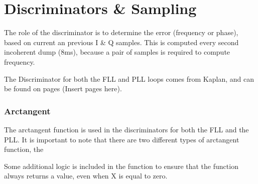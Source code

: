 \label{app6}
\chapter{Discriminators \& Sampling}

The role of the discriminator is to determine the error (frequency or phase), based on current an previous I \& Q samples. This is computed every second incoherent dump (8ms), because a pair of samples is required to compute frequency. 

The Discriminator for both the FLL and PLL loops comes from Kaplan, and can be found on pages (Insert pages here).





\begin{comment}
"It is important to note that the timing of each of the correlator channels will be locked to its own incoming signal and not to each other or to the microprocessor interrupts, so new data is generated asynchronously. The sampling instant of measurement data of all channels however is common to give a consistent navigation solution."

"Carrier DCO Programming
The following registers: CHx_CARRIER_DCO_INCR_HIGH (or X_DCO _INCR_HIGH) and CHx_CARRIER_DCO_INCR_LOW
are programmed in sequence with the relevant data according to the frequency bin being searched. It is always necessary to write to both the _HIGH and _LOW registers. Carrier DCO programming will become effective as soon as the channel is released (made active). If the channel is already active, writes to CHx_CARRIER_DCO_INCR_LOW are effective immediately. (A short delay of up to 175ns will occur, to allow synchronisation of the processor write operation to the chip operation.)"
\cite{GP2021}
\end{comment}

\subsection{Arctangent}
The arctangent function is used in the discriminators for both the FLL and the PLL. It is important to note that there are two different types of arctangent function, the 


Some additional logic is included in the function to ensure that the function always returns a value, even when X is equal to zero.

